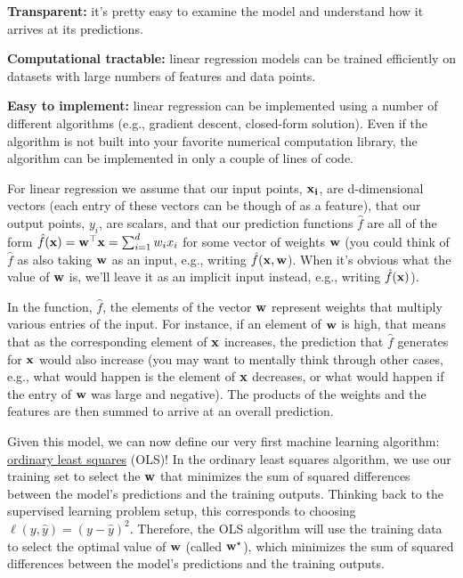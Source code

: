 \documentclass[assignment01_Solutions]{subfiles}
\begin{document}
\bi
\item \textbf{Transparent:} it's pretty easy to examine the model and understand how it arrives at its predictions.
\item \textbf{Computational tractable:} linear regression models can be trained efficiently on datasets with large numbers of features and data points.
\item \textbf{Easy to implement:} linear regression can be implemented using a number of different algorithms (e.g., gradient descent, closed-form solution).  Even if the algorithm is not built into your favorite numerical computation library, the algorithm can be implemented in only a couple of lines of code.
\ei


For linear regression we assume that our input points, $\mathbf{x_i}$, are d-dimensional vectors (each entry of these vectors can be though of as a feature), that our output points, $y_i$, are scalars, and that our prediction functions $\hat{f}$ are all of the form $\hat{f}(\mathbf{x}) = \mathbf{w}^\top \mathbf{x} = \sum_{i=1}^d w_i x_i$ for some vector of weights $\mathbf{w}$ (you could think of $\hat{f}$ as also taking $\mathbf{w}$ as an input, e.g., writing $\hat{f}(\mathbf{x}, \mathbf{w}$).  When it's obvious what the value of $\mathbf{w}$ is, we'll leave it as an implicit input instead, e.g., writing $\hat{f}(\mathbf{x})$).

In the function, $\hat{f}$, the elements of the vector $\mathbf{w}$ represent weights that multiply various entries of the input.  For instance, if an element of $\mathbf{w}$ is high, that means that as the corresponding element of $\mathbf{x}$ increases, the prediction that $\hat{f}$ generates for $\mathbf{x}$ would also increase (you may want to mentally think through other cases, e.g., what would happen is the element of $\mathbf{x}$ decreases, or what would happen if the entry of $\mathbf{w}$ was large and negative).  The products of the weights and the features are then summed to arrive at an overall prediction.

Given this model, we can now define our very first machine learning algorithm: \href{https://en.wikipedia.org/wiki/Ordinary_least_squares}{ordinary least squares} (OLS)!  In the ordinary least squares algorithm, we use our training set to select the $\mathbf{w}$ that minimizes the sum of squared differences between the model's predictions and the training outputs.  Thinking back to the supervised learning problem setup, this corresponds to choosing $\ell(y, \hat{y}) = (y - \hat{y})^2$.
Therefore, the OLS algorithm will use the training data to select the optimal value of $\mathbf{w}$ (called $\mathbf{w}^\star$), which minimizes the sum of squared differences between the model's predictions and the training outputs.
\end{document}
